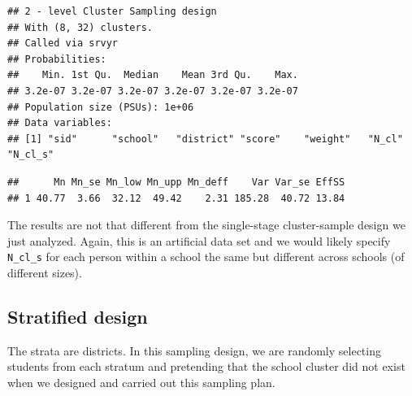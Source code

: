 \documentclass[
]{article}
\newenvironment{Shaded}{\begin{snugshade}}{\end{snugshade}}
\newcommand{\DataTypeTok}[1]{\textcolor[rgb]{0.13,0.29,0.53}{#1}}
\newcommand{\DecValTok}[1]{\textcolor[rgb]{0.00,0.00,0.81}{#1}}
\newcommand{\KeywordTok}[1]{\textcolor[rgb]{0.13,0.29,0.53}{\textbf{#1}}}
\newcommand{\NormalTok}[1]{#1}
\newcommand{\OperatorTok}[1]{\textcolor[rgb]{0.81,0.36,0.00}{\textbf{#1}}}
\newcommand{\OtherTok}[1]{\textcolor[rgb]{0.56,0.35,0.01}{#1}}
\newcommand{\StringTok}[1]{\textcolor[rgb]{0.31,0.60,0.02}{#1}}
\begin{document}
\begin{verbatim}
## 2 - level Cluster Sampling design
## With (8, 32) clusters.
## Called via srvyr
## Probabilities:
##    Min. 1st Qu.  Median    Mean 3rd Qu.    Max. 
## 3.2e-07 3.2e-07 3.2e-07 3.2e-07 3.2e-07 3.2e-07 
## Population size (PSUs): 1e+06 
## Data variables:
## [1] "sid"      "school"   "district" "score"    "weight"   "N_cl"     "N_cl_s"
\end{verbatim}

\begin{Shaded}
\end{Shaded}

\begin{verbatim}
##      Mn Mn_se Mn_low Mn_upp Mn_deff    Var Var_se EffSS
## 1 40.77  3.66  32.12  49.42    2.31 185.28  40.72 13.84
\end{verbatim}

The results are not that different from the single-stage cluster-sample design we just analyzed. Again, this is an artificial data set and we would likely specify \texttt{N\_cl\_s} for each person within a school the same but different across schools (of different sizes).

\hypertarget{stratified-design}{%
\subsection{Stratified design}\label{stratified-design}}

The strata are districts. In this sampling design, we are randomly selecting students from each stratum and pretending that the school cluster did not exist when we designed and carried out this sampling plan.
\end{document}
